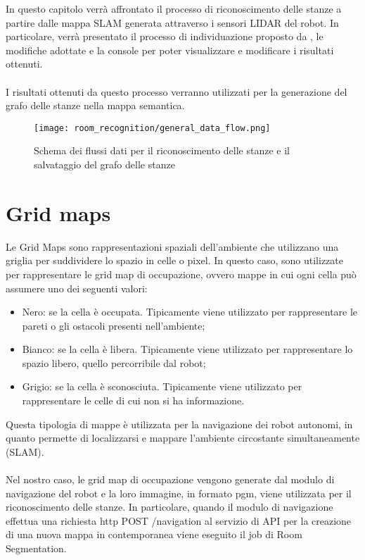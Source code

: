 In questo capitolo verrà affrontato il processo di riconoscimento delle stanze a partire dalle mappa SLAM generata attraverso i sensori LIDAR del robot. In particolare, verrà presentato il processo di individuazione proposto da \cite{mora}, le modifiche adottate e la console per poter visualizzare e modificare i risultati ottenuti.\\\\
I risultati ottenuti da questo processo verranno utilizzati per la generazione del grafo delle stanze nella mappa semantica.

\begin{figure}[H]
  \centering
  \texttt{[image: room\_recognition/general\_data\_flow.png]}
  \caption{Schema dei flussi dati per il riconoscimento delle stanze e il salvataggio del grafo delle stanze}
\end{figure}

\section{Grid maps}
Le Grid Maps sono rappresentazioni spaziali dell'ambiente che utilizzano una griglia per suddividere lo spazio in celle o pixel. In questo caso, sono utilizzate per rappresentare le grid map di occupazione, ovvero mappe in cui ogni cella può assumere uno dei seguenti valori:
\begin{itemize}
  \item Nero: se la cella è occupata. Tipicamente viene utilizzato per rappresentare le pareti o gli ostacoli presenti nell'ambiente;
  \item Bianco: se la cella è libera. Tipicamente viene utilizzato per rappresentare lo spazio libero, quello percorribile dal robot;
  \item Grigio: se la cella è sconosciuta. Tipicamente viene utilizzato per rappresentare le celle di cui non si ha informazione.
\end{itemize}
Questa tipologia di mappe è utilizzata per la navigazione dei robot autonomi, in quanto permette di localizzarsi e mappare l'ambiente circostante simultaneamente (SLAM).\\\\
Nel nostro caso, le grid map di occupazione vengono generate dal modulo di navigazione del robot e la loro immagine, in formato pgm, viene utilizzata per il riconoscimento delle stanze. In particolare, quando il modulo di navigazione effettua una richiesta http POST /navigation al servizio di API per la creazione di una nuova mappa in contemporanea viene eseguito il job di Room Segmentation.

